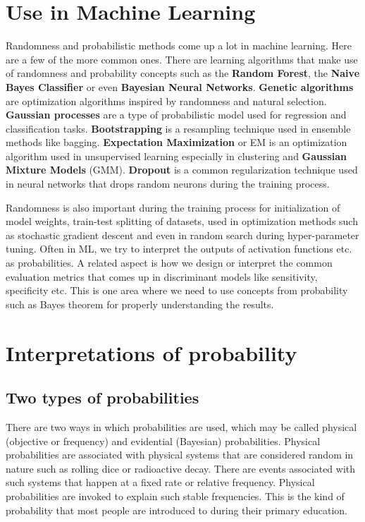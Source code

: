 \documentclass{../template/texnote}
\begin{document}
\section{Use in Machine Learning}
Randomness and probabilistic methods come up a lot in machine learning.  Here are a few of the more common ones.
There are learning algorithms that make use of randomness and probability concepts such as the \textbf{Random Forest}, the \textbf{Naive Bayes Classifier} or even \textbf{Bayesian Neural Networks}.
\textbf{Genetic algorithms} are optimization algorithms inspired by randomness and natural selection.
\textbf{Gaussian processes} are a type of probabilistic model used for regression and classification tasks.
\textbf{Bootstrapping} is a resampling technique used in ensemble methods like bagging.
\textbf{Expectation Maximization} or EM is an optimization algorithm used in unsupervised learning especially in clustering and \textbf{Gaussian Mixture Models} (GMM).
\textbf{Dropout } is a common regularization technique used in neural networks that drops random neurons during the training process.


Randomness is also important during the training process for initialization of model weights, train-test splitting of datasets, used in optimization methods such as stochastic gradient descent and even in random search during hyper-parameter tuning.
Often in ML, we try to interpret the outputs of activation functions etc. as probabilities.
A related aspect is how we design or interpret the common evaluation metrics that comes up in discriminant models like sensitivity, specificity etc.
This is one area where we need to use concepts from probability such as Bayes theorem for properly understanding the results.



\section{Interpretations of probability}
\subsection{Two types of probabilities}
There are two ways in which probabilities are used, which may be called physical (objective or frequency) and evidential (Bayesian) probabilities.
Physical probabilities are associated with physical systems that are considered random in nature such as rolling dice or radioactive decay.
There are events associated with such systems that happen at a fixed rate or relative frequency.
Physical probabilities are invoked to explain such stable frequencies.
This is the kind of probability that most people are introduced to during their primary education.
\end{document}
